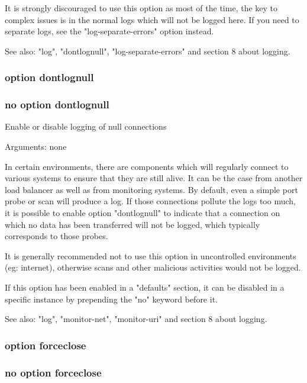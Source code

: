   It is strongly discouraged to use this option as most of the time, the key to
  complex issues is in the normal logs which will not be logged here. If you
  need to separate logs, see the "log-separate-errors" option instead.

  See also: "log", "dontlognull", "log-separate-errors" and section 8 about
             logging.

\subsubsection{option dontlognull}
\subsubsection{no option dontlognull}


  Enable or disable logging of null connections


  Arguments: none

  In certain environments, there are components which will regularly connect to
  various systems to ensure that they are still alive. It can be the case from
  another load balancer as well as from monitoring systems. By default, even a
  simple port probe or scan will produce a log. If those connections pollute
  the logs too much, it is possible to enable option "dontlognull" to indicate
  that a connection on which no data has been transferred will not be logged,
  which typically corresponds to those probes.

  It is generally recommended not to use this option in uncontrolled
  environments (eg: internet), otherwise scans and other malicious activities
  would not be logged.

  If this option has been enabled in a "defaults" section, it can be disabled
  in a specific instance by prepending the "no" keyword before it.

  See also: "log", "monitor-net", "monitor-uri" and section 8 about logging.

\subsubsection{option forceclose}
\subsubsection{no option forceclose}

